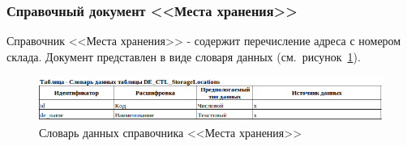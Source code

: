 %
%
%
%
%



\subsubsection{Справочный документ <<Места хранения>>}

Справочник <<Места хранения>> - содержит перечисление адреса с номером склада.
Документ представлен в виде словаря данных (см.~рисунок~\ref{fig:InformationalModel_DE_CTL_StorageLocations}).

\begin{figure}[!h]
    \centering
    \includegraphics[width=16cm]
    {assets/InformationalModel/DE_CTL_StorageLocations.png}
    \caption{Словарь данных справочника <<Места хранения>>}
    \label{fig:InformationalModel_DE_CTL_StorageLocations}
\end{figure}

